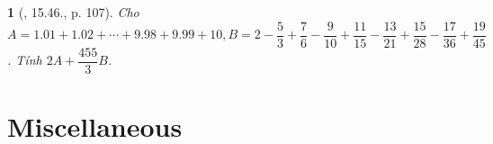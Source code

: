 \documentclass{article}
\newtheorem{baitoan}{}
\begin{document}
\begin{baitoan}[\cite{TLCT_THCS_Toan_6_so_hoc}, 15.46., p. 107]
	Cho $A = 1.01 + 1.02 + \cdots + 9.98 + 9.99 + 10,B = 2 - \dfrac{5}{3} + \dfrac{7}{6} - \dfrac{9}{10} + \dfrac{11}{15} - \dfrac{13}{21} + \dfrac{15}{28} - \dfrac{17}{36} + \dfrac{19}{45}$. Tính $2A + \dfrac{455}{3}B$.
\end{baitoan}


\section{Miscellaneous}


\printbibliography[heading=bibintoc]
	
\end{document}
